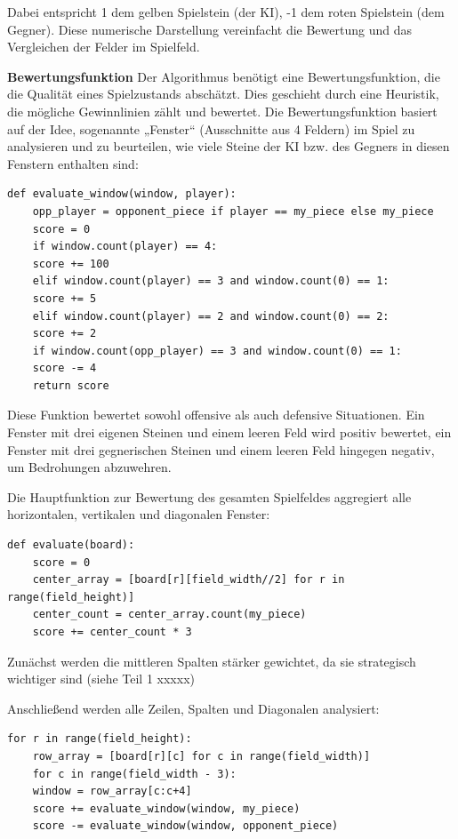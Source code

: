 Dabei entspricht 1 dem gelben Spielstein (der KI), -1 dem roten Spielstein (dem Gegner). Diese numerische Darstellung vereinfacht die Bewertung und das Vergleichen der Felder im Spielfeld.

\textbf{Bewertungsfunktion}
Der Algorithmus benötigt eine Bewertungsfunktion, die die Qualität eines Spielzustands abschätzt. Dies geschieht durch eine Heuristik, die mögliche Gewinnlinien zählt und bewertet.
Die Bewertungsfunktion basiert auf der Idee, sogenannte „Fenster“ (Ausschnitte aus 4 Feldern) im Spiel zu analysieren und zu beurteilen, wie viele Steine der KI bzw. des Gegners in diesen Fenstern enthalten sind:

\begin{lstlisting}[style=pythonstyle]
	def evaluate_window(window, player):
	opp_player = opponent_piece if player == my_piece else my_piece
	score = 0
	if window.count(player) == 4:
	score += 100
	elif window.count(player) == 3 and window.count(0) == 1:
	score += 5
	elif window.count(player) == 2 and window.count(0) == 2:
	score += 2
	if window.count(opp_player) == 3 and window.count(0) == 1:
	score -= 4
	return score
\end{lstlisting}

Diese Funktion bewertet sowohl offensive als auch defensive Situationen. Ein Fenster mit drei eigenen Steinen und einem leeren Feld wird positiv bewertet, ein Fenster mit drei gegnerischen Steinen und einem leeren Feld hingegen negativ, um Bedrohungen abzuwehren.

Die Hauptfunktion zur Bewertung des gesamten Spielfeldes aggregiert alle horizontalen, vertikalen und diagonalen Fenster:

\begin{lstlisting}[style=pythonstyle]
	def evaluate(board):
	score = 0
	center_array = [board[r][field_width//2] for r in range(field_height)]
	center_count = center_array.count(my_piece)
	score += center_count * 3
\end{lstlisting}

Zunächst werden die mittleren Spalten stärker gewichtet, da sie strategisch wichtiger sind (siehe Teil 1 xxxxx)

Anschließend werden alle Zeilen, Spalten und Diagonalen analysiert:

\begin{lstlisting}[style=pythonstyle]
	for r in range(field_height):
	row_array = [board[r][c] for c in range(field_width)]
	for c in range(field_width - 3):
	window = row_array[c:c+4]
	score += evaluate_window(window, my_piece)
	score -= evaluate_window(window, opponent_piece)
\end{lstlisting}

